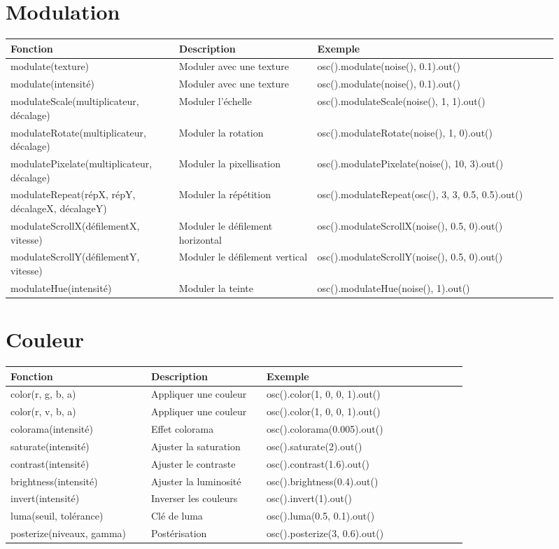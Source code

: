 \documentclass[9pt,oneside]{amsart}
\begin{document}
\section*{Modulation}
\begin{tabular}{L{0.28\linewidth}L{0.23\linewidth}L{0.40\linewidth}}
\toprule
\textbf{Fonction} & \textbf{Description} & \textbf{Exemple} \\
\midrule
modulate(texture) & Moduler avec une texture & osc().modulate(noise(), 0.1).out() \\
modulate(intensité) & Moduler avec une texture & osc().modulate(noise(), 0.1).out() \\
modulateScale(multiplicateur, décalage) & Moduler l'échelle & osc().modulateScale(noise(), 1, 1).out() \\
modulateRotate(multiplicateur, décalage) & Moduler la rotation & osc().modulateRotate(noise(), 1, 0).out() \\
modulatePixelate(multiplicateur, décalage) & Moduler la pixellisation & osc().modulatePixelate(noise(), 10, 3).out() \\
modulateRepeat(répX, répY, décalageX, décalageY) & Moduler la répétition & osc().modulateRepeat(osc(), 3, 3, 0.5, 0.5).out() \\
modulateScrollX(défilementX, vitesse) & Moduler le défilement horizontal & osc().modulateScrollX(noise(), 0.5, 0).out() \\
modulateScrollY(défilementY, vitesse) & Moduler le défilement vertical & osc().modulateScrollY(noise(), 0.5, 0).out() \\
modulateHue(intensité) & Moduler la teinte & osc().modulateHue(noise(), 1).out() \\
\bottomrule
\end{tabular}

\section*{Couleur}
\begin{tabular}{L{0.28\linewidth}L{0.23\linewidth}L{0.40\linewidth}}
\toprule
\textbf{Fonction} & \textbf{Description} & \textbf{Exemple} \\
\midrule
color(r, g, b, a) & Appliquer une couleur & osc().color(1, 0, 0, 1).out() \\
color(r, v, b, a) & Appliquer une couleur & osc().color(1, 0, 0, 1).out() \\
colorama(intensité) & Effet colorama & osc().colorama(0.005).out() \\
saturate(intensité) & Ajuster la saturation & osc().saturate(2).out() \\
contrast(intensité) & Ajuster le contraste & osc().contrast(1.6).out() \\
brightness(intensité) & Ajuster la luminosité & osc().brightness(0.4).out() \\
invert(intensité) & Inverser les couleurs & osc().invert(1).out() \\
luma(seuil, tolérance) & Clé de luma & osc().luma(0.5, 0.1).out() \\
posterize(niveaux, gamma) & Postérisation & osc().posterize(3, 0.6).out() \\
\bottomrule
\end{tabular}
\end{document}
